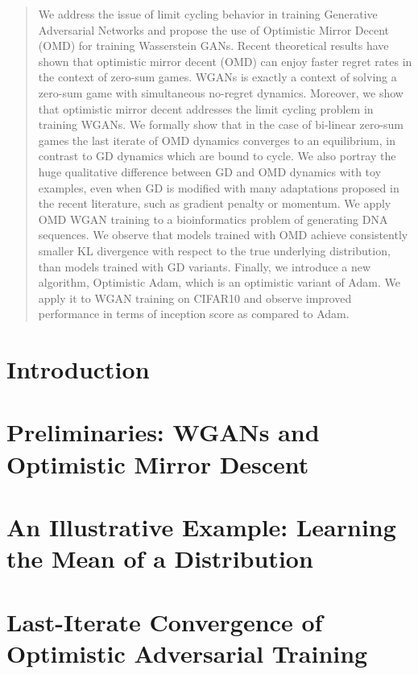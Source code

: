 \documentclass{article} %
\newcommand{\1}{\mathbbm{1}}
\theoremstyle{plain}
\begin{document}
\begin{abstract}
We address the issue of limit cycling behavior in training Generative Adversarial Networks and propose the use of Optimistic Mirror Decent (OMD) for training Wasserstein GANs. Recent theoretical results have shown that optimistic mirror decent (OMD) can enjoy faster regret rates in the context of zero-sum games. WGANs is exactly a context of solving a zero-sum game with simultaneous no-regret dynamics.  Moreover, we show that optimistic mirror decent addresses the limit cycling problem in training WGANs. We formally show that in the case of bi-linear zero-sum games the last iterate of OMD dynamics converges to an equilibrium, in contrast to GD dynamics which are bound to cycle. We also portray the huge qualitative difference between GD and OMD dynamics with toy examples, even when GD is modified with many adaptations proposed in the recent literature, such as gradient penalty or momentum. We apply OMD WGAN training to a bioinformatics problem of generating DNA sequences. We observe that models trained with OMD achieve consistently smaller KL divergence with respect to the true underlying distribution, than models trained with GD variants. Finally, we introduce a new algorithm, Optimistic Adam, which is an optimistic variant of Adam. We apply it to WGAN training on CIFAR10 and observe improved performance in terms of inception score as compared to Adam.
\end{abstract}

\section{Introduction}


\section{Preliminaries: WGANs and Optimistic Mirror Descent}


\section{An Illustrative Example: Learning the Mean of a Distribution}\label{sec:illustrative}


\section{Last-Iterate Convergence of Optimistic Adversarial Training}

\end{document}
